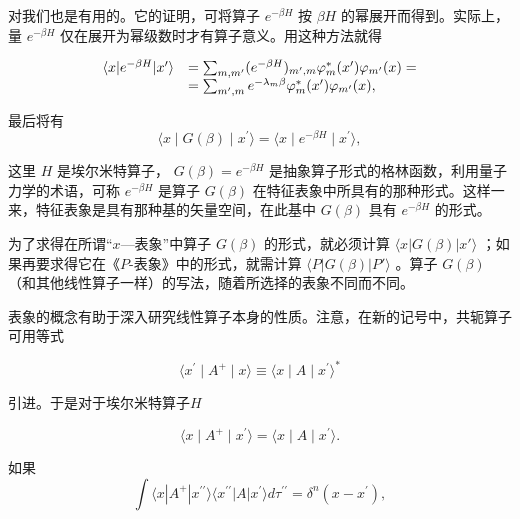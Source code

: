 对我们也是有用的。它的证明，可将算子 $e^{-\beta H}$ 按 $\beta H$ 的幂展开而得到。实际上，量 $e^{-\beta H}$ 仅在展开为幂级数时才有算子意义。用这种方法就得

\begin{equation*}
\begin{array}{r l} \langle x | e ^ {- \beta H} | x ^ {\prime} \rangle & = \sum_ {m, m ^ {\prime}} (e ^ {- \beta H}) _ {m ^ {\prime}, m} \varphi_ {m} ^ {*} (x ^ {\prime}) \varphi_ {m ^ {\prime}} (x) = \\ & = \sum_ {m ^ {\prime}, m} e ^ {- \lambda_ {m} \beta} \varphi_ {m} ^ {*} (x ^ {\prime}) \varphi_ {m ^ {\prime}} (x), \end{array}
\end{equation*}

最后将有
\begin{equation*}
\langle x \mid G (\beta) \mid x ^ {\prime} \rangle = \langle x \mid e ^ {- \beta H} \mid x ^ {\prime} \rangle ,\tag{5.18a}
\end{equation*}

这里 $H$ 是埃尔米特算子， $G(\beta) = e^{-\beta H}$ 是抽象算子形式的格林函数，利用量子力学的术语，可称 $e^{-\beta H}$ 是算子 $G(\beta)$ 在特征表象中所具有的那种形式。这样一来，特征表象是具有那种基的矢量空间，在此基中 $G(\beta)$ 具有 $e^{-\beta H}$ 的形式。

为了求得在所谓“$x$—表象”中算子 $G(\beta)$ 的形式，就必须计算 $\langle x|G(\beta)|x'\rangle$ ；如果再要求得它在《$P$-表象》中的形式，就需计算 $\langle P|G(\beta)|P'\rangle$ 。算子 $G(\beta)$ （和其他线性算子一样）的写法，随着所选择的表象不同而不同。

表象的概念有助于深入研究线性算子本身的性质。注意，在新的记号中，共轭算子可用等式

\begin{equation*}
\langle x ^ {\prime} \mid A ^ {+} \mid x \rangle \equiv \langle x \mid A \mid x ^ {\prime} \rangle^ {*}
\end{equation*}

引进。于是对于埃尔米特算子$H$

\begin{equation*}
\langle x \mid A ^ {+} \mid x ^ {\prime} \rangle = \langle x \mid A \mid x ^ {\prime} \rangle .
\end{equation*}

如果
\begin{equation*}
\int \langle x | A ^ {+} | x ^ {\prime \prime} \rangle \langle x ^ {\prime \prime} | A | x ^ {\prime} \rangle d \tau^ {\prime \prime} = \delta^ {n} (x - x ^ {\prime}),
\end{equation*}

